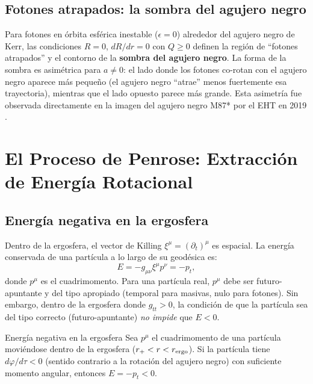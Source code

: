 \subsection{Fotones atrapados: la sombra del agujero negro}

Para fotones en órbita esférica inestable ($\epsilon = 0$) alrededor del agujero negro de Kerr, las condiciones $R = 0$, $dR/dr = 0$ con $Q \geq 0$ definen la región de ``fotones atrapados'' y el contorno de la \textbf{sombra del agujero negro}. La forma de la sombra es asimétrica para $a \neq 0$: el lado donde los fotones co-rotan con el agujero negro aparece más pequeño (el agujero negro ``atrae'' menos fuertemente esa trayectoria), mientras que el lado opuesto parece más grande. Esta asimetría fue observada directamente en la imagen del agujero negro M87* por el EHT en 2019 \cite{EHT2019}.

\section{El Proceso de Penrose: Extracción de Energía Rotacional}
\label{sec:penrose}

\subsection{Energía negativa en la ergosfera}

Dentro de la ergosfera, el vector de Killing $\xi^\mu = (\partial_t)^\mu$ es espacial. La energía conservada de una partícula a lo largo de su geodésica es:
\begin{equation}
  E = -g_{\mu\nu}\xi^\mu p^\nu = -p_t,
  \label{eq:energia_geodesica}
\end{equation}
donde $p^\mu$ es el cuadrimomento. Para una partícula real, $p^\mu$ debe ser futuro-apuntante y del tipo apropiado (temporal para masivas, nulo para fotones). Sin embargo, dentro de la ergosfera donde $g_{tt} > 0$, la condición de que la partícula sea del tipo correcto (futuro-apuntante) \emph{no impide} que $E < 0$.

\begin{proposicion}{Energía negativa en la ergosfera}{}
Sea $p^\mu$ el cuadrimomento de una partícula moviéndose dentro de la ergosfera ($r_+ < r < r_{\rm ergo}$). Si la partícula tiene $d\varphi/d\tau < 0$ (sentido contrario a la rotación del agujero negro) con suficiente momento angular, entonces $E = -p_t < 0$.
\end{proposicion}

